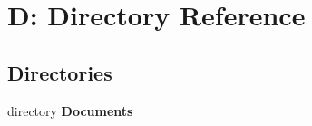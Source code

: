 \section{D\-: Directory Reference}
\label{dir_275089585c7fc1b5fd5d7d42c69cb1da}
\subsection*{Directories}
\begin{DoxyCompactItemize}
\item 
directory {\bf Documents}
\end{DoxyCompactItemize}
